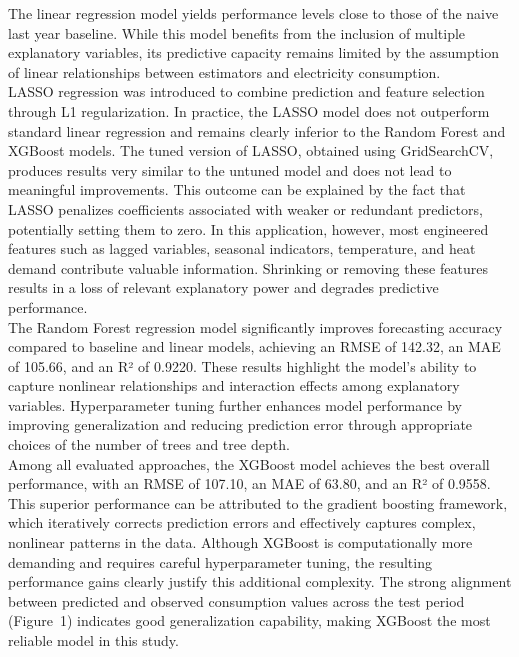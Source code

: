 \documentclass[11pt,a4paper]{article}
\begin{document}
The linear regression model yields performance levels close to those of the naive last year baseline. While this model benefits from the inclusion of multiple explanatory variables, its predictive capacity remains limited by the assumption of linear relationships between estimators and electricity consumption.\\

LASSO regression was introduced to combine prediction and feature selection through L1 regularization. In practice, the LASSO model does not outperform standard linear regression and remains clearly inferior to the Random Forest and XGBoost models. The tuned version of LASSO, obtained using GridSearchCV, produces results very similar to the untuned model and does not lead to meaningful improvements. This outcome can be explained by the fact that LASSO penalizes coefficients associated with weaker or redundant predictors, potentially setting them to zero. In this application, however, most engineered features such as lagged variables, seasonal indicators, temperature, and heat demand contribute valuable information. Shrinking or removing these features results in a loss of relevant explanatory power and degrades predictive performance.\\

The Random Forest regression model significantly improves forecasting accuracy compared to baseline and linear models, achieving an RMSE of 142.32, an MAE of 105.66, and an R² of 0.9220. These results highlight the model’s ability to capture nonlinear relationships and interaction effects among explanatory variables. Hyperparameter tuning further enhances model performance by improving generalization and reducing prediction error through appropriate choices of the number of trees and tree depth.\\

Among all evaluated approaches, the XGBoost model achieves the best overall performance, with an RMSE of 107.10, an MAE of 63.80, and an R² of 0.9558. This superior performance can be attributed to the gradient boosting framework, which iteratively corrects prediction errors and effectively captures complex, nonlinear patterns in the data. Although XGBoost is computationally more demanding and requires careful hyperparameter tuning, the resulting performance gains clearly justify this additional complexity. The strong alignment between predicted and observed consumption values across the test period (Figure~1) indicates good generalization capability, making XGBoost the most reliable model in this study.\\
\end{document}
